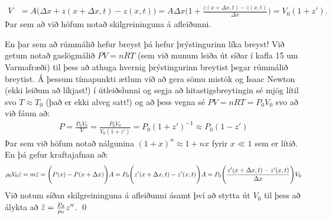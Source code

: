 \ifdefined \wholebook \else\documentclass[oneside]{book}\usepackage{EdlBook}\graphicspath{{figures/}}
\begin{document}
\begin{align*}
    V &= A\Bigg( \Delta x + z(x+\Delta x,t) - z(x,t) \Bigg) = A \Delta x \Bigg( 1 + \frac{z(x+\Delta x,t)-z(x,t)}{\Delta x} \Bigg) = V_0 \left(1 + z'\right).
\end{align*}
Þar sem að við höfum notað skilgreininguna á afleiðunni.

En þar sem að rúmmálið hefur breyst þá hefur þrýstingurinn líka breyst! Við getum notað gaslögmálið $PV = nRT$ (sem við munum leiða út síðar í kafla 15 um Varmafræði) til þess að athuga hvernig þrýstingurinn breytist þegar rúmmálið breytist. Á þessum tímapunkti ætlum við að gera sömu mistök og Isaac Newton (ekki leiðum að líkjast!) í útleiðslunni og segja að hitastigsbreytingin sé mjög lítil svo $T \approx T_0$ (það er ekki alveg satt!) og að þess vegna sé $PV = nRT = P_0 V_0$ svo að við fáum að:
\begin{align*}
    P = \frac{P_0 V_0}{V} = \frac{P_0 V_0}{V_0 ( 1+ z')} = P_0 \left( 1 + z' \right)^{-1} \approx P_0(1 - z')
\end{align*}
Þar sem við höfum notað nálgunina $(1+x)^n \approx 1 + nx$ fyrir $x \ll 1$ sem er lítið. En þá gefur kraftajafnan að:
\begin{align*}
    \rho_0 V_0 \Ddot{z} = m \Ddot{z} =  \Bigg(P(x)-P(x+\Delta x)\Bigg)A = P_0\Bigg( z'(x+\Delta x,t) - z'(x,t) \Bigg)A = P_0\Bigg( \frac{z'(x+\Delta x, t)-z'(x,t)}{\Delta x} \Bigg) V_0
\end{align*}
Við notum síðan skilgreininguna á afleiðunni ásamt því að stytta út $V_0$ til þess að álykta að $\Ddot{z} = \frac{P_0}{\rho_0} z''$.
\qed 

\vspace{0.5cm}
\end{document}
